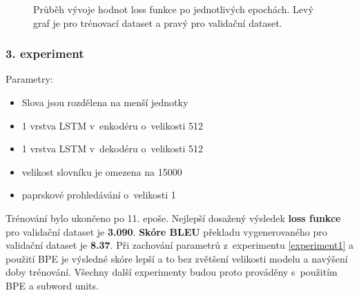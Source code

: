 \begin{figure}[H]
    \begin{center}
    \end{center}
	\caption{Průběh vývoje hodnot loss funkce po jednotlivých epochách. Levý graf je pro trénovací dataset a pravý pro validační dataset.}
\end{figure}


\subsubsection{3. experiment}\label{experiment3}
Parametry:
\begin{itemize}
  \item Slova jsou rozdělena na menší jednotky
  \item 1 vrstva LSTM v~enkodéru o~velikosti 512
  \item 1 vrstva LSTM v~dekodéru o~velikosti 512
  \item velikost slovníku je omezena na 15000
  \item paprskové prohledávání o~velikosti 1
\end{itemize}

Trénování bylo ukončeno po 11. epoše. Nejlepší dosažený výsledek \textbf{loss funkce} pro validační dataset je \textbf{3.090}. \textbf{Skóre BLEU} překladu vygenerovaného pro validační dataset je \textbf{8.37}. Při zachování parametrů z~experimentu \ref{experiment1} a použití BPE je výsledné skóre lepší a to bez zvětšení velikosti modelu a navýšení doby trénování. Všechny další experimenty budou proto prováděny s~použitím BPE a subword units.

